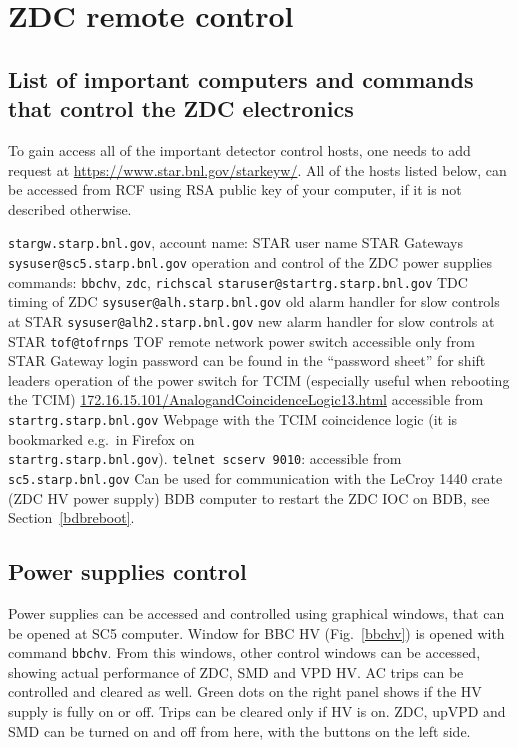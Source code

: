 
\chapter{\label{remote}ZDC remote control}
\section{\label{computers}List of important computers and commands that control the ZDC electronics}

To gain access all of the important detector control hosts, one needs to add request at \url{https://www.star.bnl.gov/starkeyw/}. All of the hosts listed below, can be accessed from RCF using RSA public key of your computer, if it is not described otherwise.
\begin{outline}
 \1 \texttt{stargw.starp.bnl.gov}, account name: STAR user name
   \2 STAR Gateways
 \1 \texttt{sysuser@sc5.starp.bnl.gov} 
   \2 operation and control of the ZDC power supplies
   \2 commands: \texttt{bbchv}, \texttt{zdc}, \texttt{richscal}
 \1 \texttt{staruser@startrg.starp.bnl.gov}
   \2 TDC timing of ZDC
 \1 \texttt{sysuser@alh.starp.bnl.gov} 
   \2 old alarm handler for slow controls at STAR
 \1 \texttt{sysuser@alh2.starp.bnl.gov}
   \2 new alarm handler for slow controls at STAR
 \1 \texttt{tof@tofrnps}
   \2 TOF remote network power switch
   \2 accessible only from STAR Gateway
   \2 login password can be found in the ``password sheet'' for shift leaders
   \2 operation of the power switch for TCIM (especially useful when rebooting the TCIM)
 \1 \url{172.16.15.101/AnalogandCoincidenceLogic13.html}
   \2 accessible from \texttt{startrg.starp.bnl.gov}
   \2 Webpage with the TCIM coincidence logic (it is bookmarked e.g.\ in Firefox on\\
   \texttt{startrg.starp.bnl.gov}).
 \1 \texttt{telnet scserv 9010}: 
   \2 accessible  from \texttt{sc5.starp.bnl.gov}
   \2 Can be used for communication with the LeCroy 1440 crate (ZDC HV power supply)
   \2 BDB computer
   \2 to restart the ZDC IOC on BDB, see Section~\ref{bdbreboot}.
\end{outline}


\section{\label{HVcontrol}Power supplies control}
Power supplies can be accessed and controlled using graphical windows, that can be opened at SC5 computer. 
Window for BBC HV (Fig.~\ref{bbchv}) is opened with command \texttt{bbchv}. From this windows, other control windows can be accessed, showing actual performance of ZDC, SMD and VPD HV\@. AC trips can be controlled and cleared as well. Green dots on the right panel shows if the HV supply is fully on or off. Trips can be cleared only if HV is on. ZDC, upVPD and SMD can be turned on and off from here, with the buttons on the left side.

